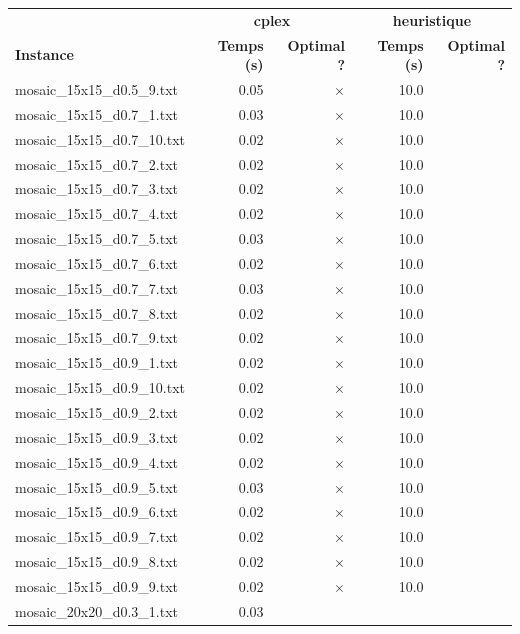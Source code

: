 \documentclass{article}
\begin{document}
\newpage
\begin{center}
\renewcommand{\arraystretch}{1.4} 
 \begin{tabular}{lrrrr}
	\hline
 & \multicolumn{2}{c}{\textbf{cplex}} & \multicolumn{2}{c}{\textbf{heuristique}}\\
\textbf{Instance}  & \textbf{Temps (s)} & \textbf{Optimal ?}  & \textbf{Temps (s)} & \textbf{Optimal ?} \\\hline

mosaic\_15x15\_d0.5\_9.txt & 0.05 & 
$\times$
 & 10.0 & 
\\
mosaic\_15x15\_d0.7\_1.txt & 0.03 & 
$\times$
 & 10.0 & 
\\
mosaic\_15x15\_d0.7\_10.txt & 0.02 & 
$\times$
 & 10.0 & 
\\
mosaic\_15x15\_d0.7\_2.txt & 0.02 & 
$\times$
 & 10.0 & 
\\
mosaic\_15x15\_d0.7\_3.txt & 0.02 & 
$\times$
 & 10.0 & 
\\
mosaic\_15x15\_d0.7\_4.txt & 0.02 & 
$\times$
 & 10.0 & 
\\
mosaic\_15x15\_d0.7\_5.txt & 0.03 & 
$\times$
 & 10.0 & 
\\
mosaic\_15x15\_d0.7\_6.txt & 0.02 & 
$\times$
 & 10.0 & 
\\
mosaic\_15x15\_d0.7\_7.txt & 0.03 & 
$\times$
 & 10.0 & 
\\
mosaic\_15x15\_d0.7\_8.txt & 0.02 & 
$\times$
 & 10.0 & 
\\
mosaic\_15x15\_d0.7\_9.txt & 0.02 & 
$\times$
 & 10.0 & 
\\
mosaic\_15x15\_d0.9\_1.txt & 0.02 & 
$\times$
 & 10.0 & 
\\
mosaic\_15x15\_d0.9\_10.txt & 0.02 & 
$\times$
 & 10.0 & 
\\
mosaic\_15x15\_d0.9\_2.txt & 0.02 & 
$\times$
 & 10.0 & 
\\
mosaic\_15x15\_d0.9\_3.txt & 0.02 & 
$\times$
 & 10.0 & 
\\
mosaic\_15x15\_d0.9\_4.txt & 0.02 & 
$\times$
 & 10.0 & 
\\
mosaic\_15x15\_d0.9\_5.txt & 0.03 & 
$\times$
 & 10.0 & 
\\
mosaic\_15x15\_d0.9\_6.txt & 0.02 & 
$\times$
 & 10.0 & 
\\
mosaic\_15x15\_d0.9\_7.txt & 0.02 & 
$\times$
 & 10.0 & 
\\
mosaic\_15x15\_d0.9\_8.txt & 0.02 & 
$\times$
 & 10.0 & 
\\
mosaic\_15x15\_d0.9\_9.txt & 0.02 & 
$\times$
 & 10.0 & 
\\
mosaic\_20x20\_d0.3\_1.txt & 0.03 & 

\end{tabular}
\end{center}
\end{document}
